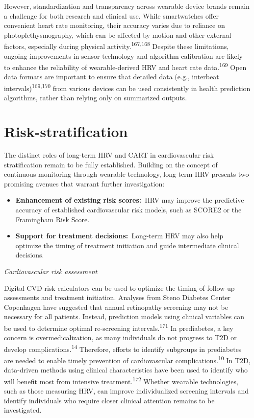 \documentclass[
  a4paper,
  headsepline=true,
  open=any]{scrbook}
\begin{document}
However, standardization and transparency across wearable device brands
remain a challenge for both research and clinical use. While
smartwatches offer convenient heart rate monitoring, their accuracy
varies due to reliance on photoplethysmography, which can be affected by
motion and other external factors, especially during physical
activity.\textsuperscript{167,168} Despite these limitations, ongoing
improvements in sensor technology and algorithm calibration are likely
to enhance the reliability of wearable-derived HRV and heart rate
data.\textsuperscript{169} Open data formats are important to ensure
that detailed data (e.g., interbeat intervals)\textsuperscript{169,170}
from various devices can be used consistently in health prediction
algorithms, rather than relying only on summarized outputs.

\hypertarget{risk-stratification-1}{%
\section{Risk-stratification}\label{risk-stratification-1}}

The distinct roles of long-term HRV and CART in cardiovascular risk
stratification remain to be fully established. Building on the concept
of continuous monitoring through wearable technology, long-term HRV
presents two promising avenues that warrant further investigation:

\begin{itemize}
\item
  \textbf{Enhancement of existing risk scores:}~HRV may improve the
  predictive accuracy of established cardiovascular risk models, such as
  SCORE2 or the Framingham Risk Score.
\item
  \textbf{Support for treatment decisions:}~Long-term HRV may also help
  optimize the timing of treatment initiation and guide intermediate
  clinical decisions.
\end{itemize}

\emph{Cardiovascular risk assessment}

Digital CVD risk calculators can be used to optimize the timing of
follow-up assessments and treatment initiation. Analyses from Steno
Diabetes Center Copenhagen have suggested that annual retinopathy
screening may not be necessary for all patients. Instead, prediction
models using clinical variables can be used to determine optimal
re-screening intervals.\textsuperscript{171} In prediabetes, a key
concern is overmedicalization, as many individuals do not progress to
T2D or develop complications.\textsuperscript{14} Therefore, efforts to
identify subgroups in prediabetes are needed to enable timely prevention
of cardiovascular complications.\textsuperscript{10} In T2D, data-driven
methods using clinical characteristics have been used to identify who
will benefit most from intensive treatment.\textsuperscript{172} Whether
wearable technologies, such as those measuring HRV, can improve
individualized screening intervals and identify individuals who require
closer clinical attention remains to be investigated.
\end{document}
